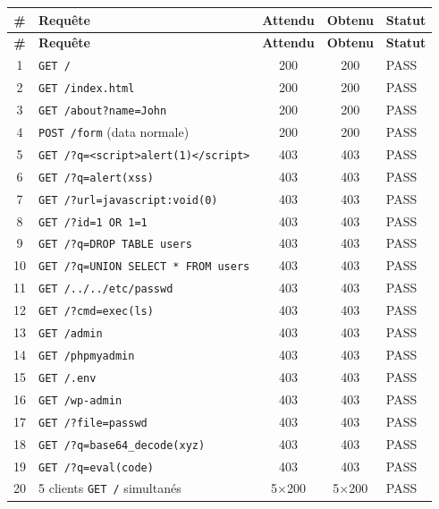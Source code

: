 \documentclass[12pt,a4paper]{article}
\begin{document}
\begin{longtable}{clccl}
  \toprule
  \textbf{\#} & \textbf{Requête} & \textbf{Attendu} & \textbf{Obtenu} & \textbf{Statut} \\
  \midrule
  \endfirsthead
  \toprule
  \textbf{\#} & \textbf{Requête} & \textbf{Attendu} & \textbf{Obtenu} & \textbf{Statut} \\
  \midrule
  \endhead
  1  & \texttt{GET /}                                     & 200          & 200          & PASS \\
  2  & \texttt{GET /index.html}                           & 200          & 200          & PASS \\
  3  & \texttt{GET /about?name=John}                      & 200          & 200          & PASS \\
  4  & \texttt{POST /form} (data normale)                 & 200          & 200          & PASS \\
  5  & \texttt{GET /?q=<script>alert(1)</script>}         & 403          & 403          & PASS \\
  6  & \texttt{GET /?q=alert(xss)}                        & 403          & 403          & PASS \\
  7  & \texttt{GET /?url=javascript:void(0)}              & 403          & 403          & PASS \\
  8  & \texttt{GET /?id=1 OR 1=1}                         & 403          & 403          & PASS \\
  9  & \texttt{GET /?q=DROP TABLE users}                  & 403          & 403          & PASS \\
  10 & \texttt{GET /?q=UNION SELECT * FROM users}         & 403          & 403          & PASS \\
  11 & \texttt{GET /../../etc/passwd}                     & 403          & 403          & PASS \\
  12 & \texttt{GET /?cmd=exec(ls)}                        & 403          & 403          & PASS \\
  13 & \texttt{GET /admin}                                & 403          & 403          & PASS \\
  14 & \texttt{GET /phpmyadmin}                           & 403          & 403          & PASS \\
  15 & \texttt{GET /.env}                                 & 403          & 403          & PASS \\
  16 & \texttt{GET /wp-admin}                             & 403          & 403          & PASS \\
  17 & \texttt{GET /?file=passwd}                         & 403          & 403          & PASS \\
  18 & \texttt{GET /?q=base64\_decode(xyz)}               & 403          & 403          & PASS \\
  19 & \texttt{GET /?q=eval(code)}                        & 403          & 403          & PASS \\
  20 & 5 clients \texttt{GET /} simultanés                & 5$\times$200 & 5$\times$200 & PASS \\
  \bottomrule
\end{longtable}
\end{document}
